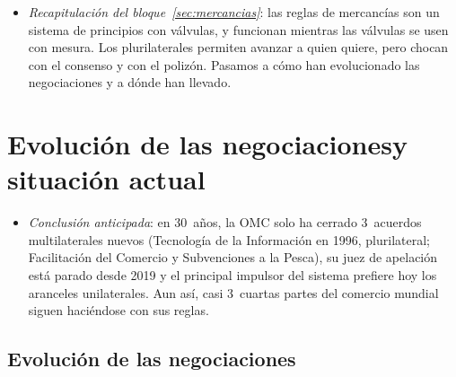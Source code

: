 \documentclass[11pt]{article}
\begin{document}
\begin{itemize}
\item \emph{Recapitulación del bloque~\ref{sec:mercancias}}: las reglas de mercancías son un sistema de principios con válvulas, y funcionan mientras las válvulas se usen con mesura. Los plurilaterales permiten avanzar a quien quiere, pero chocan con el consenso y con el polizón. Pasamos a cómo han evolucionado las negociaciones y a dónde han llevado.
\end{itemize}

\section{Evolución de las negociaciones\cortetitulo y situación actual}\label{sec:actual}

\begin{itemize}
\item \emph{Conclusión anticipada}: en 30~años, la OMC solo ha cerrado 3~acuerdos multilaterales nuevos (Tecnología de la Información en 1996, plurilateral; Facilitación del Comercio y Subvenciones a la Pesca), su juez de apelación está parado desde 2019 y el principal impulsor del sistema prefiere hoy los aranceles unilaterales. Aun así, casi 3~cuartas partes del comercio mundial siguen haciéndose con sus reglas.
\end{itemize}

\subsection{Evolución de las negociaciones}\label{sec:evolucion}
\end{document}
